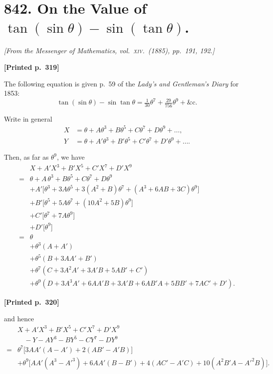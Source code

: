 \documentclass[11pt]{article}
\begin{document}
\section*{842. On the Value of $\tan(\sin\theta) - \sin(\tan\theta)$.}

\smallskip
\noindent\textit{[From the Messenger of Mathematics, vol.\ \textsc{xiv}.\ (1885), pp.\ 191, 192.]}

\medskip

\noindent\textbf{[Printed p.~319]}\hfill

The following equation is given p.~59 of the \textit{Lady's and Gentleman's Diary} for 1853:
\[
\tan(\sin\theta) - \sin\tan\theta = \tfrac{1}{30}\theta^{7} + \tfrac{29}{756}\theta^{9} + \&\mathrm{c}.
\]

Write in general
\begin{align*}
X &= \theta + A\theta^{3} + B\theta^{5} + C\theta^{7} + D\theta^{9} + \ldots, \\
Y &= \theta + A'\theta^{3} + B'\theta^{5} + C'\theta^{7} + D'\theta^{9} + \ldots.
\end{align*}

Then, as far as $\theta^{9}$, we have
\begin{align*}
& X + A'X^{3} + B'X^{5} + C'X^{7} + D'X^{9} \\
={}& \theta + A\,\theta^{3} + B\theta^{5} + C\theta^{7} + D\theta^{9} \\
&+ A'\bigl[\theta^{3} + 3A\theta^{5} + 3(A^{2}+B)\theta^{7} + (A^{3} + 6AB + 3C)\theta^{9}\bigr] \\
&+ B'\bigl[\theta^{5} + 5A\theta^{7} + (10A^{2} + 5B)\theta^{9}\bigr] \\
&+ C'\bigl[\theta^{7} + 7A\theta^{9}\bigr] \\
&+ D'\bigl[\theta^{9}\bigr] \\
={}& \theta \\
&+ \theta^{3}(A + A') \\
&+ \theta^{5}(B + 3AA' + B') \\
&+ \theta^{7}(C + 3A^{2}A' + 3A'B + 5AB' + C') \\
&+ \theta^{9}(D + 3A^{3}A' + 6A A'B + 3A'B + 6AB'A + 5BB' + 7AC' + D').
\end{align*}

\medskip

\noindent\textbf{[Printed p.~320]}\hfill

and hence
\begin{align*}
& X + A'X^{3} + B'X^{5} + C'X^{7} + D'X^{9} \\
&\quad - Y - AY^{3} - BY^{5} - CY^{7} - DY^{9} \\
={}& \theta^{7}\bigl[3AA'(A-A') + 2(AB' - A'B)\bigr] \\
&+ \theta^{9}\bigl[AA'(A^{3} - A'^{3}) + 6AA'(B-B') + 4(AC' - A'C) + 10(A^{2}B'A - A'^{2}B)\bigr].
\end{align*}
\end{document}
